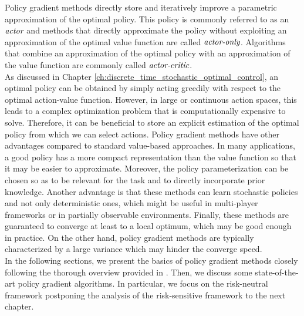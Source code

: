 Policy gradient methods directly store and iteratively improve a parametric approximation of the optimal policy. This policy is commonly referred to as an $\emph{actor}$ and methods that directly approximate the policy without exploiting an approximation of the optimal value function are called $\emph{actor-only}$. Algorithms that combine an approximation of the optimal policy with an approximation of the value function are commonly called $\emph{actor-critic}$.\\
As discussed in Chapter \ref{ch:discrete_time_stochastic_optimal_control}, an optimal policy can be obtained by simply acting greedily with respect to the optimal action-value function. However, in large or continuous action spaces, this leads to a complex optimization problem that is computationally expensive to solve. Therefore, it can be beneficial to store an explicit estimation of the optimal policy from which we can select actions. Policy gradient methods have other advantages compared to standard value-based approaches. In many applications, a good policy has a more compact		representation than the value function so that it may be easier to approximate. Moreover, the policy parameterization can be chosen so as to be relevant for the task and to directly incorporate prior knowledge. Another advantage is that these methods can learn stochastic policies and not only deterministic ones, which might be useful in multi-player frameworks or in partially observable environments. Finally, these methods are guaranteed to converge at least to a local optimum, which may be good enough in practice. On the other hand, policy gradient methods are typically characterized by a large variance which may hinder the converge speed.\\
In the following sections, we present the basics of policy gradient methods closely following the thorough overview provided in \cite{peters2008reinforcement}. Then, we discuss some state-of-the-art policy gradient algorithms. In particular, we focus on the risk-neutral framework postponing the analysis of the risk-sensitive framework to the next chapter. 

